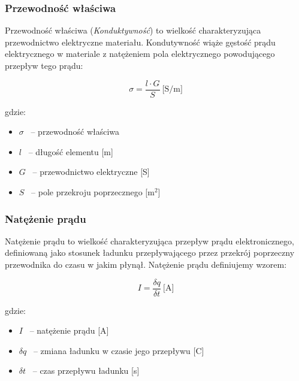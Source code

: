 \documentclass[a4paper,12pts]{article}
\begin{document}

	\subsubsection{Przewodność właściwa}
	
	Przewodność właściwa (\textit{Konduktywność}) to wielkość charakteryzująca przewodnictwo elektryczne materiału. Kondutywność wiąże gęstość prądu elektrycznego w materiale z natężeniem pola elektrycznego powodującego przepływ tego prądu: 
	
	\begin{equation}
		\sigma = \frac{l \cdot G}{S} ~\textrm{[S/m]}
	\end{equation}
	
	\newpage
	gdzie:
	\begin{itemize}
		\item $\sigma$ ~-- przewodność właściwa 
		\item $l$ ~-- długość elementu [m]
		\item $G$ ~-- przewodnictwo elektryczne [S]
		\item $S$ ~-- pole przekroju poprzecznego [m$^{2}$]
	\end{itemize}


	\subsubsection{Natężenie prądu}
	
	Natężenie prądu to wielkość charakteryzująca przepływ prądu elektronicznego, definiowaną jako stosunek ładunku przepływającego przez przekrój poprzeczny przewodnika do czasu w jakim płynął. Natężenie prądu definiujemy wzorem:
	
	\begin{equation}
		I = \frac{\delta q}{\delta t} ~\textrm{[A]}
	\end{equation}
	
	gdzie:
	\begin{itemize}
		\item $I$ ~-- natężenie prądu [A]
		\item $\delta q$ ~-- zmiana ładunku w czasie jego przepływu [C]
		\item $\delta t$ ~-- czas przepływu ładunku [s]
	\end{itemize}
	
\end{document}

